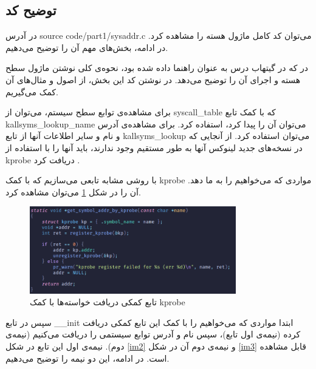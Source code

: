 \documentclass[12pt]{article}
\begin{document}
        \subsection{توضیح کد}
        در آدرس 
        \textenglish{source code/part1/sysaddr.c}
        می‌توان کد کامل ماژول هسته را مشاهده کرد.
        در ادامه، بخش‌های مهم آن را توضیح می‌دهیم.

        در
        \cite{sourcerer-kernel-module}
        که در گیتهاب درس به عنوان راهنما داده شده بود، نحوه‌ی کلی نوشتن ماژول سطح هسته و اجرای آن را توضیح می‌دهد. در نوشتن کد این بخش، از اصول و مثال‌های آن کمک می‌گیریم.

        برای مشاهده‌ی توابع سطح سیستم، می‌توان از
        \textenglish{syscall\_table}
        که با کمک تابع
        \textenglish{kallsyms\_lookup\_name}
        می‌توان آن را پیدا کرد،
        استفاده کرد. برای مشاهده‌ی آدرس و نام و سایر اطلاعات 
        آنها از تابع
        \textenglish{kallsyms\_lookup}
        می‌توان استفاده کرد. از آنجایی که در نسخه‌های جدید لینوکس آنها به طور مستقیم وجود ندارند، باید آنها را با استفاده از
        \textenglish{kprobe}
        دریافت کرد
        \cite{github-issue-kallsyms}.

        با روشی مشابه
        \cite{github-issue-kallsyms}
        تابعی می‌سازیم که با کمک
        \textenglish{kprobe}
        مواردی که می‌خواهیم را به ما دهد. آن را در شکل
        \ref{im1}
        می‌توان مشاهده کرد.

        \begin{figure}[H]
		\centering
		\includegraphics[width=0.8\textwidth]{report8-resources/1.png}
		\caption{تابع کمکی دریافت خواسته‌ها با کمک \textenglish{kprobe}}
            \label{im1}
	\end{figure}

        سپس در تابع 
        \textenglish{\_\_init}
        ابتدا مواردی که می‌خواهیم را با کمک این تابع کمکی دریافت کرده (نیمه‌ی اول تابع)، سپس نام و آدرس توابع سیستمی را دریافت می‌کنیم (نیمه‌ی دوم).
        نیمه‌ی اول این تابع در شکل
        \ref{im2}
        و نیمه‌ی دوم آن در شکل
        \ref{im3}
        قابل مشاهده است.
        در ادامه‌، این دو نیمه را توضیح می‌دهیم.
\end{document}
